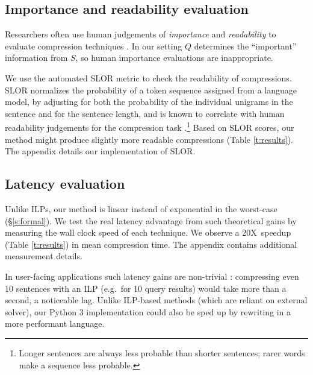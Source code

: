 \documentclass[11pt,a4paper]{article}
\newcommand{\speedup}[0]{20X~}
\begin{document}
\subsection{Importance and readability evaluation}\label{s:readabilityinformativeness}

Researchers often use human judgements of \textit{importance} and \textit{readability} to evaluate compression techniques \cite{Knight2000StatisticsBasedS,filippova2015sentence}. In our setting $Q$ determines the ``important'' information from $S$, so human importance evaluations are inappropriate.

We use the automated SLOR metric \cite{lau2015unsupervised} to check the readability of compressions. SLOR normalizes the probability of a token sequence assigned from a language model, by adjusting for both the probability of the individual unigrams in the sentence and for the sentence length, and is known to correlate with human readability judgements for the compression task \cite{kannConl}.\footnote{Longer sentences are always less probable than shorter sentences; rarer words make a sequence less probable.} Based on SLOR scores, our method might produce slightly more readable compressions (Table \ref{t:results}). The appendix details our implementation of SLOR. 

\subsection{Latency evaluation}\label{s:costs}

Unlike ILPs, our method is linear instead of exponential in the worst-case (\S\ref{s:formal}). We test the real latency advantage from such theoretical gains by measuring the wall clock speed of each technique. We observe a \speedup speedup (Table \ref{t:results}) in mean compression time. The appendix contains additional measurement details.

In user-facing applications such latency gains are non-trivial \cite{Nielsen,heerschei,Liu2014TheEO}: compressing even 10 sentences with an ILP (e.g.\ for 10 query results) would take more than a second, a noticeable lag. Unlike ILP-based methods (which are reliant on external solver), our Python 3 implementation could also be sped up by rewriting in a more performant language. 
\end{document}
